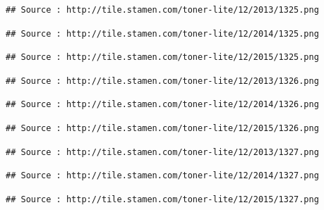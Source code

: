 \documentclass[]{book}
\begin{document}
\begin{verbatim}
## Source : http://tile.stamen.com/toner-lite/12/2013/1325.png
\end{verbatim}

\begin{verbatim}
## Source : http://tile.stamen.com/toner-lite/12/2014/1325.png
\end{verbatim}

\begin{verbatim}
## Source : http://tile.stamen.com/toner-lite/12/2015/1325.png
\end{verbatim}

\begin{verbatim}
## Source : http://tile.stamen.com/toner-lite/12/2013/1326.png
\end{verbatim}

\begin{verbatim}
## Source : http://tile.stamen.com/toner-lite/12/2014/1326.png
\end{verbatim}

\begin{verbatim}
## Source : http://tile.stamen.com/toner-lite/12/2015/1326.png
\end{verbatim}

\begin{verbatim}
## Source : http://tile.stamen.com/toner-lite/12/2013/1327.png
\end{verbatim}

\begin{verbatim}
## Source : http://tile.stamen.com/toner-lite/12/2014/1327.png
\end{verbatim}

\begin{verbatim}
## Source : http://tile.stamen.com/toner-lite/12/2015/1327.png
\end{verbatim}
\end{document}
